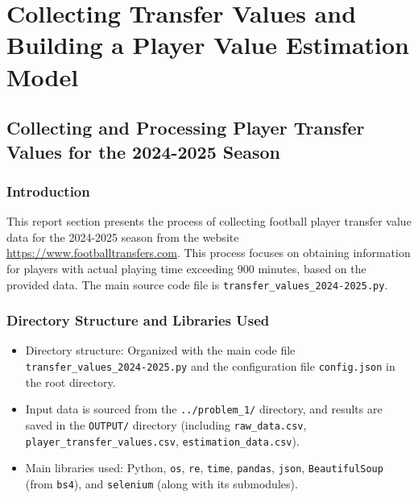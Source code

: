 \documentclass[12pt, a4paper]{report}
\begin{document}
\chapter{Collecting Transfer Values and Building a Player Value Estimation Model}

\section{Collecting and Processing Player Transfer Values for the 2024-2025 Season}

\subsection{Introduction}
This report section presents the process of collecting football player transfer value data for the 2024-2025 season from the website \url{https://www.footballtransfers.com}.
This process focuses on obtaining information for players with actual playing time exceeding 900 minutes, based on the provided data.
The main source code file is \texttt{transfer\_values\_2024-2025.py}.

\subsection{Directory Structure and Libraries Used}
\begin{itemize}
    \item Directory structure: Organized with the main code file \texttt{transfer\_values\_2024-2025.py} and the configuration file \texttt{config.json} in the root directory.
    \item Input data is sourced from the \texttt{../problem\_1/} directory, and results are saved in the \texttt{OUTPUT/} directory (including \texttt{raw\_data.csv}, \texttt{player\_transfer\_values.csv}, \texttt{estimation\_data.csv}).
    \item {Main libraries used:} Python, \texttt{os}, \texttt{re}, \texttt{time}, \texttt{pandas}, \texttt{json}, \texttt{BeautifulSoup} (from \texttt{bs4}), and \texttt{selenium} (along with its submodules).
\end{itemize}
\end{document}
